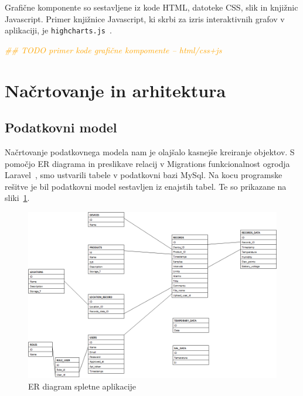 \documentclass[a4paper, 12pt]{book}
\begin{document}
Grafične komponente so sestavljene iz kode HTML, datoteke CSS, slik in knjižnic Javascript.
Primer knjižnice Javascript, ki skrbi za izris interaktivnih grafov v aplikaciji, je {\tt highcharts.js}~\cite{hightchars-js}.

\textcolor{orange}{\textit{\#\# TODO primer kode grafične kompomente – html/css+js}} \\



\section{Načrtovanje in arhitektura}

\subsection{Podatkovni model}

Načrtovanje podatkovnega modela nam je olajšalo kasnejše kreiranje objektov. S pomočjo ER diagrama in preslikave relacij v Migrations funkcionalnost ogrodja Laravel~\cite{laravel-migrations}, smo ustvarili tabele v podatkovni bazi MySql. Na kocu programske rešitve je bil podatkovni model sestavljen iz enajstih tabel. Te so prikazane na sliki~\ref{database-model}.

\begin{figure}[t]
\begin{center}
\includegraphics[width=\textwidth]{slike/database_model-updated-for-diploma-1.png}
\end{center}
\caption{ER diagram spletne aplikacije}
\label{database-model}
\end{figure}
\end{document}
